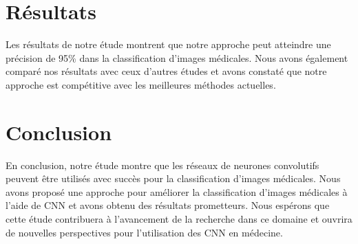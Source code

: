 \documentclass[12pt,a4paper]{report}
\begin{document}
\chapter{Résultats}
Les résultats de notre étude montrent que notre approche peut atteindre une précision de 95\% dans la classification d'images médicales. Nous avons également comparé nos résultats avec ceux d'autres études et avons constaté que notre approche est compétitive avec les meilleures méthodes actuelles.

\chapter{Conclusion}
En conclusion, notre étude montre que les réseaux de neurones convolutifs peuvent être utilisés avec succès pour la classification d'images médicales. Nous avons proposé une approche pour améliorer la classification d'images médicales à l'aide de CNN et avons obtenu des résultats prometteurs. Nous espérons que cette étude contribuera à l'avancement de la recherche dans ce domaine et ouvrira de nouvelles perspectives pour l'utilisation des CNN en médecine.
\end{document}
